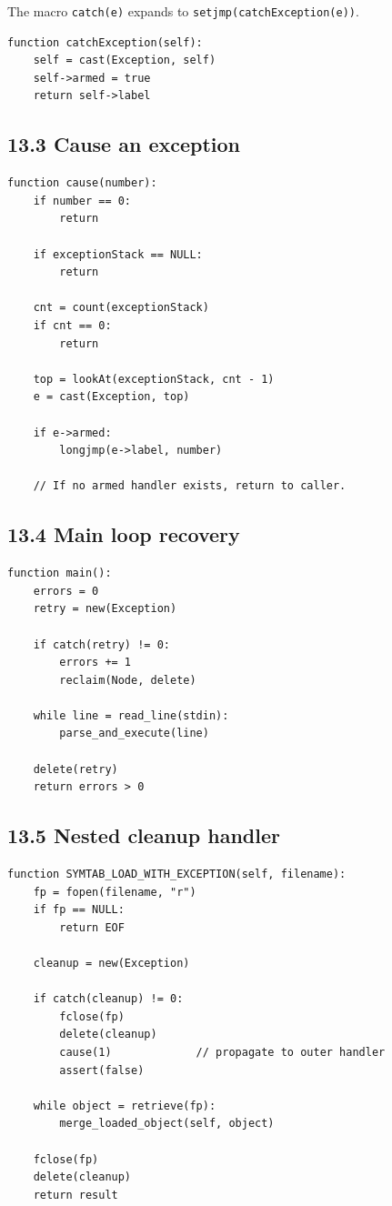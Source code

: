 \documentclass[11pt]{article}
\begin{document}
The macro \texttt{catch(e)} expands to
\texttt{setjmp(catchException(e))}.

\begin{verbatim}
function catchException(self):
    self = cast(Exception, self)
    self->armed = true
    return self->label
\end{verbatim}

\subsection{13.3 Cause an exception}\label{cause-an-exception}

\begin{verbatim}
function cause(number):
    if number == 0:
        return

    if exceptionStack == NULL:
        return

    cnt = count(exceptionStack)
    if cnt == 0:
        return

    top = lookAt(exceptionStack, cnt - 1)
    e = cast(Exception, top)

    if e->armed:
        longjmp(e->label, number)

    // If no armed handler exists, return to caller.
\end{verbatim}

\subsection{13.4 Main loop recovery}\label{main-loop-recovery}

\begin{verbatim}
function main():
    errors = 0
    retry = new(Exception)

    if catch(retry) != 0:
        errors += 1
        reclaim(Node, delete)

    while line = read_line(stdin):
        parse_and_execute(line)

    delete(retry)
    return errors > 0
\end{verbatim}

\subsection{13.5 Nested cleanup handler}\label{nested-cleanup-handler}

\begin{verbatim}
function SYMTAB_LOAD_WITH_EXCEPTION(self, filename):
    fp = fopen(filename, "r")
    if fp == NULL:
        return EOF

    cleanup = new(Exception)

    if catch(cleanup) != 0:
        fclose(fp)
        delete(cleanup)
        cause(1)             // propagate to outer handler
        assert(false)

    while object = retrieve(fp):
        merge_loaded_object(self, object)

    fclose(fp)
    delete(cleanup)
    return result
\end{verbatim}
\end{document}
